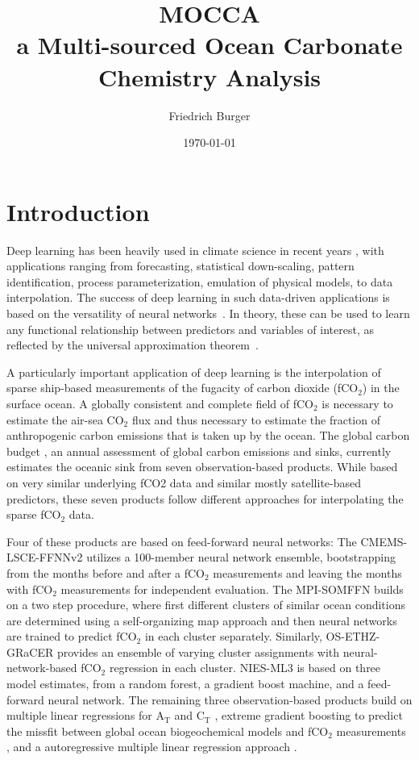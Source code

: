 \documentclass{article}
\title{\textbf{MOCCA} \\[0.25cm]
\large a Multi-sourced Ocean Carbonate Chemistry Analysis}
\author{Friedrich Burger}
\date{\today}
\begin{document}
	
	\maketitle
	\tableofcontents
	\section{Introduction}
	Deep learning has been heavily used in climate science in recent years \citep{reichstein2019}, with applications ranging from forecasting, statistical down-scaling, pattern identification, process parameterization, emulation of physical models, to data interpolation. The success of deep learning in such data-driven applications is based on the versatility of neural networks~\cite{goodfellow2016}. In theory, these can be used to learn any functional relationship between predictors and variables of interest, as reflected by the universal approximation theorem~\cite{hornik1989}.
	
	A particularly important application of deep learning is the interpolation of sparse ship-based measurements of the fugacity of carbon dioxide (fCO$_2$) in the surface ocean. A globally consistent and complete field of fCO$_2$ is necessary to estimate the air-sea CO$_2$ flux and thus necessary to estimate the fraction of anthropogenic carbon emissions that is taken up by the ocean. The global carbon budget \citep{friedlingstein2023}, an annual assessment of global carbon emissions and sinks, currently estimates the oceanic sink from seven observation-based products. While based on very similar underlying fCO2 data and similar mostly satellite-based predictors, these seven products follow different approaches for interpolating the sparse fCO$_2$ data. 
	
	Four of these products are based on feed-forward neural networks: The CMEMS-LSCE-FFNNv2 \citep{chau2022} utilizes a 100-member neural network ensemble,  bootstrapping from the months before and after a fCO$_2$ measurements and leaving the months with fCO$_2$ measurements for independent evaluation. The MPI-SOMFFN \citep{landschuetzer2016} builds on a two step procedure, where first different clusters of similar ocean conditions are determined using a self-organizing map approach and then neural networks are trained to predict fCO$_2$ in each cluster separately. Similarly, OS-ETHZ-GRaCER \citep{gregor2021} provides an ensemble of varying cluster assignments with neural-network-based fCO$_2$ regression in each cluster. NIES-ML3 \citep{zeng2022} is based on three model estimates, from a random forest, a gradient boost machine, and a feed-forward neural network. The remaining three observation-based products build on multiple linear regressions for A$_\text{T}$ and C$_\text{T}$ \citep[fundamental variables to calculate fCO$_2$ and other carbonate system variables; JMA-MLR;][]{iida2021}, extreme gradient boosting to predict the missfit between global ocean biogeochemical models and fCO$_2$ measurements \citep[LDEO-HPD;][]{gloege2022}, and a autoregressive multiple linear regression approach \citep[Jena-MLS;][]{roedenbeck2022}.
	
\end{document}
